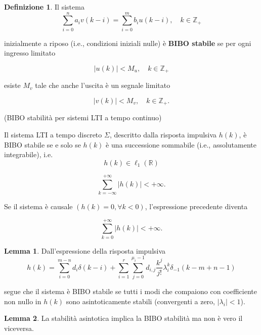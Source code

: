 \documentclass{article}
\theoremstyle{definition}
\newtheorem*{definizione}{Definizione}
\newtheorem*{lemma}{Lemma}
\begin{document}
	
\begin{definizione}
	

	Il sistema  
	\[
	\sum_{i=0}^{n} a_i v(k-i) = \sum_{i=0}^{m} b_i u(k-i), \quad k \in \mathbb{Z}_+
	\]
	
	inizialmente a riposo (i.e., condizioni iniziali nulle) è \textbf{BIBO stabile} se per ogni ingresso limitato  
	
	\[
	|u(k)| < M_u, \quad k \in \mathbb{Z}_+
	\]
	
	esiste \( M_v \) tale che anche l'uscita è un segnale limitato  
	
	\[
	|v(k)| < M_v, \quad k \in \mathbb{Z}_+.
	\]
\end{definizione}
\begin{teo}{(BIBO stabilità per sistemi LTI a tempo continuo)}{}


	Il sistema LTI a tempo discreto \(\Sigma\), descritto dalla risposta impulsiva \(h(k)\), è BIBO stabile se e solo se \(h(k)\) è una successione sommabile (i.e., assolutamente integrabile), i.e.  
	\[
	h(k) \in \ell_1(\mathbb{R})
	\]
	
	\[
	\sum_{k=-\infty}^{+\infty} |h(k)| < +\infty.
	\]
	
	Se il sistema è causale \((h(k) = 0, \forall k < 0)\), l'espressione precedente diventa
	
	\[
	\sum_{k=0}^{+\infty} |h(k)| < +\infty.
	\]
\end{teo}

\begin{lemma}
	Dall'espressione della risposta impulsiva
	\[
	h(k) = \sum_{i=0}^{m-n} d_i \delta (k-i) + \sum_{i=1}^r \sum_{j=0}^{\mu_i-1} d_{i,j} \frac{k^j}{j!} \lambda_i^k \delta_{-1} (k-m+n-1)
	\]
	
	segue che il sistema è BIBO stabile se tutti i modi che compaiono con coefficiente non nullo in \( h(k) \) sono asintoticamente stabili (convergenti a zero, \( |\lambda_i| < 1 \)).  
\end{lemma}
\begin{lemma}
	La stabilità asintotica implica la BIBO stabilità ma non è vero il viceversa.
\end{lemma}

\newpage
\end{document}
